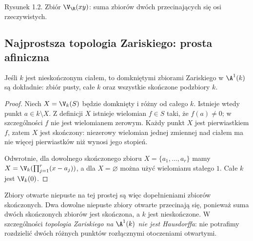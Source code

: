 \begin{center}
\end{center}
\begin{center}\small Rysunek 1.2. Zbiór $\V_{\R}(xy)$: suma zbiorów dwóch przecinających się osi rzeczywistych.\end{center}

\subsection{Najprostsza topologia Zariskiego: prosta afiniczna}

\begin{stwierdzenie}
\label{st:A1-top}
Jeśli $k$ jest nieskończonym ciałem, to domkniętymi zbiorami
Zariskiego w $\A^1(k)$ są dokładnie: zbiór pusty, całe $k$
oraz wszystkie skończone podzbiory $k$.
\end{stwierdzenie}
\begin{proof}
Niech $X=\V_k(S)$ będzie domknięty i różny od całego $k$.
Istnieje wtedy punkt $a\in k\setminus X$. Z definicji $X$
istnieje wielomian $f\in S$ taki, że $f(a)\ne0$;
w szczególności $f$ nie jest wielomianem zerowym.
Każdy punkt $X$ jest pierwiastkiem $f$, zatem $X$ jest skończony:
niezerowy wielomian jednej zmiennej nad ciałem ma nie więcej
pierwiastków niż wynosi jego stopień.

Odwrotnie, dla dowolnego skończonego zbioru
$X=\{a_1,\dots,a_r\}$ mamy
$X=\V_k(\prod_{j=1}^r(x-a_j))$, a dla $X=\varnothing$
można użyć wielomianu stałego $1$. Całe $k$ jest $\V_k(0)$.
\end{proof}

Zbiory otwarte niepuste na tej prostej są więc dopełnieniami
zbiorów skończonych. Dwa dowolne niepuste zbiory otwarte przecinają się,
ponieważ suma dwóch skończonych zbiorów jest skończona, a $k$ jest
nieskończone. W szczególności \emph{topologia Zariskiego na $\A^1(k)$
nie jest Hausdorffa}: nie potrafimy rozdzielić dwóch różnych punktów
rozłącznymi otoczeniami otwartymi.

